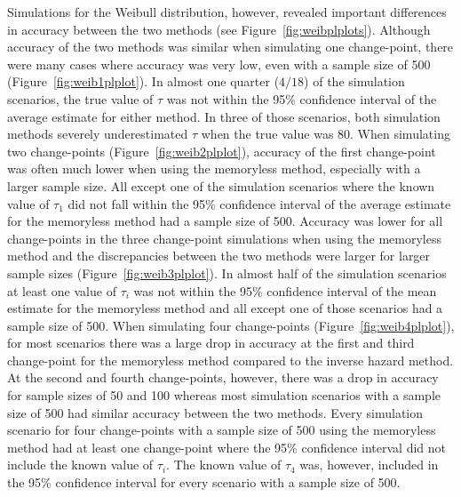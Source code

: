 Simulations for the Weibull distribution, however, revealed important differences in accuracy between the two methods (see Figure~\ref{fig:weibplplots}). Although accuracy of the two methods was similar when simulating one change-point, there were many cases where accuracy was very low, even with a sample size of 500 (Figure~\ref{fig:weib1plplot}). In almost one quarter ($4/18$) of the simulation scenarios, the true value of $\tau$ was not within the 95\% confidence interval of the average estimate for either method. In three of those scenarios, both simulation methods severely underestimated $\tau$ when the true value was 80. When simulating two change-points (Figure~\ref{fig:weib2plplot}), accuracy of the first change-point was often much lower when using the memoryless method, especially with a larger sample size. All except one of the simulation scenarios where the known value of $\tau_1$ did not fall within the 95\% confidence interval of the average estimate for the memoryless method had a sample size of 500. Accuracy was lower for all change-points in the three change-point simulations when using the memoryless method and the discrepancies between the two methods were larger for larger sample sizes (Figure~\ref{fig:weib3plplot}). In almost half of the simulation scenarios at least one value of $\tau_i$ was not within the 95\% confidence interval of the mean estimate for the memoryless method and all except one of those scenarios had a sample size of 500. When simulating four change-points (Figure~\ref{fig:weib4plplot}), for most scenarios there was a large drop in accuracy at the first and third change-point for the memoryless method compared to the inverse hazard method. At the second and fourth change-points, however, there was a drop in accuracy for sample sizes of 50 and 100 whereas most simulation scenarios with a sample size of 500 had similar accuracy between the two methods. Every simulation scenario for four change-points with a sample size of 500 using the memoryless method had at least one change-point where the 95\% confidence interval did not include the known value of $\tau_i$. The known value of $\tau_4$ was, however, included in the 95\% confidence interval for every scenario with a sample size of 500.

